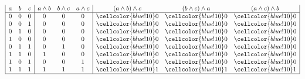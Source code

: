 \documentclass{article}
\begin{document}
    \begin{center}
    \vspace{2em}
    $\begin{array}{| c c c | c c c | c c c| }
        a & b & c & a \land b & b \land c  & a \land c  & (a \land b) \land c  & (b \land c) \land a  & (a \land c) \land b \\ 
        \hline 
        0 & 0 & 0 & 0 & 0 & 0 & \cellcolor{blue!10} 0 & \cellcolor{blue!10}0   & \cellcolor{blue!10} 0  \\
        0 & 0 & 1 & 0 & 0 & 0 & \cellcolor{blue!10}0 & \cellcolor{blue!10}0  & \cellcolor{blue!10}0  \\
        0 & 1 & 0 & 0 & 0 & 0 & \cellcolor{blue!10}0 & \cellcolor{blue!10}0  & \cellcolor{blue!10}0  \\
        1 & 0 & 0 & 0 & 0 & 0 & \cellcolor{blue!10}0 & \cellcolor{blue!10}0  &\cellcolor{blue!10} 0  \\

        0 & 1 & 1 & 0 & 1 & 0 & \cellcolor{blue!10}0 & \cellcolor{blue!10}0  & \cellcolor{blue!10}0  \\
        1 & 1 & 0 & 1 & 0 & 0 & \cellcolor{blue!10}0 & \cellcolor{blue!10}0  & \cellcolor{blue!10}0  \\
        1 & 0 & 1 & 0 & 0 & 1 & \cellcolor{blue!10}0 & \cellcolor{blue!10}0  & \cellcolor{blue!10}0  \\
    
        1 & 1 & 1 & 1 & 1 & 1 & \cellcolor{blue!10}1 & \cellcolor{blue!10}1  & \cellcolor{blue!10}1  \\
        \hline 
     
    \end{array}$ \\ 
    \end{center}
\end{document}
